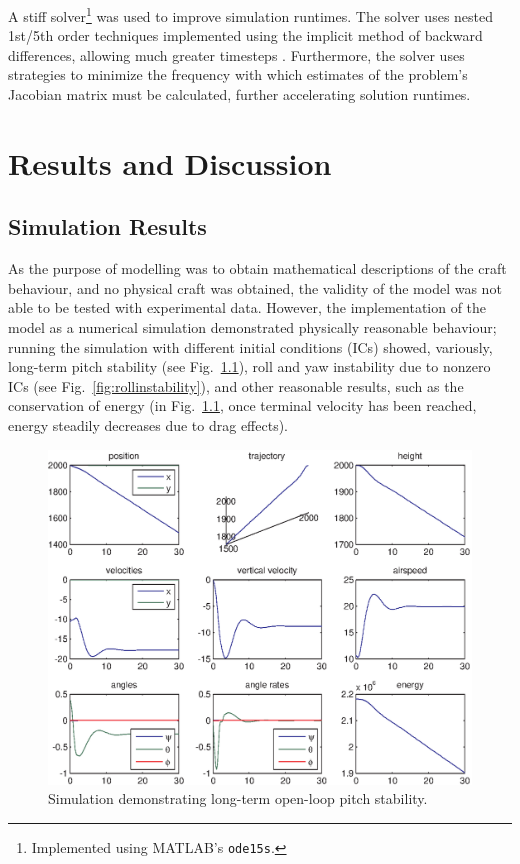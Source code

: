 \documentclass{sydeStyle}
\begin{document}
A stiff solver\footnote{Implemented using MATLAB's \texttt{ode15s}.} was used to
improve simulation runtimes.  The solver uses nested 1st/5th order techniques
implemented using the implicit method of backward differences, allowing much
greater timesteps \cite{SR97}.  Furthermore, the solver uses strategies to
minimize the frequency with which estimates of the problem's Jacobian matrix
must be calculated, further accelerating solution runtimes.

\chapter{Results and Discussion}
\label{sec:results}

\section{Simulation Results}
\label{sec:simresults}
As the purpose of modelling was to obtain mathematical descriptions of the craft
behaviour, and no physical craft was obtained, the validity of the model was not
able to be tested with experimental data.  However, the implementation of the
model as a numerical simulation demonstrated physically reasonable behaviour;
running the simulation with different initial conditions (ICs) showed,
variously, long-term pitch stability (see Fig.~\ref{fig:pitchstability}), roll
and yaw instability due to nonzero ICs (see Fig.~\ref{fig:rollinstability}), and
other reasonable results, such as the conservation of energy (in
Fig.~\ref{fig:pitchstability}, once terminal velocity has been reached, energy
steadily decreases due to drag effects).

\begin{figure}
    \begin{center}
        \includegraphics[width=0.8\columnwidth]{figs/pitchstable}
    \end{center}
    \caption{Simulation demonstrating long-term open-loop pitch stability.}
    \label{fig:pitchstability}
\end{figure}
\end{document}
